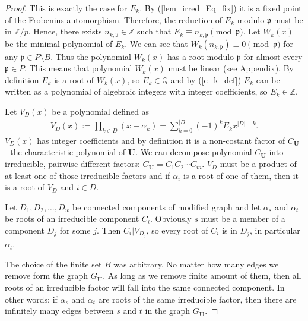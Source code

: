 \documentclass[preprint,12pt]{elsarticle}
\newcommand{\Z}{\mathbb{Z}}
\newcommand{\Q}{\mathbb{Q}}
\newcommand{\pp}{\mathfrak{p} }
\begin{document}
\begin{proof}
    This is exactly the case for $E_k$. By (\ref{lem_irred_Eq_fix}) it is a fixed point of the Frobenius automorphism. Therefore, the reduction of $E_k$ modulo $\pp$ must be in $\Z/p$.
    Hence, there exists $n_{k,\pp}\in\Z$ such that $E_k \equiv n_{k,\pp} \pmod \pp $. Let $W_k(x)$ be the minimal polynomial of $E_k$. We can see that $W_k(n_{k,\pp})\equiv 0\pmod \pp$ for any $\pp\in P\setminus B$. Thus the polynomial $W_k(x)$ has a root modulo $\pp$ for almost every $\pp\in P$. This means that polynomial $W_k(x)$ must be linear (see Appendix). 
    By definition $E_k$ is a root of $W_k(x)$, so $E_k \in \Q$ and by (\ref{e_k_def}) $E_k$ can be written as a polynomial of algebraic integers with integer coefficients, so $E_k\in \Z$.

    Let $V_D(x)$ be a polynomial defined as
    \begin{align}
        V_D(x) := \prod_{k\in D} (x-\alpha_k) = \sum_{k=0}^{|D|}(-1)^k E_kx^{|D|-k}.
    \end{align}
    $V_D(x)$ has integer coefficients and by definition it is a non-costant factor of $C_{\mathbf U}$ - the characteristic polynomial of $\textbf{U}$. We can decompose polynomial $C_{\mathbf U}$ into irreducible, pairwise different factors: $C_{\mathbf U} = C_1C_2\cdots C_m$. $V_D$ must be a product of at least one of those irreducible factors and if $\alpha_i$ is a root of one of them, then it is a root of $V_D$ and $i\in D$.
    
    Let $D_1, D_2, \ldots, D_w$ be connected components of modified graph and let $\alpha_s$ and $\alpha_t$ be roots of an irreducible component $C_i$. Obviously $s$ must be a member of a component $D_j$ for some $j$. Then $C_i|V_{D_j}$, so every root of $C_i$ is in $D_j$, in particular $\alpha_t$.

    The choice of the finite set $B$ was arbitrary. No matter how many edges we remove form the graph $G_\mathbf{U}$. As long as we remove finite amount of them, then all roots of an irreducible factor will fall into the same connected component. In other words: if $\alpha_s$ and $\alpha_t$ are roots of the same irreducible factor, then there are infinitely many edges between $s$ and $t$ in the graph $G_\mathbf{U}$. 

    

    

    

\end{proof}
\end{document}
